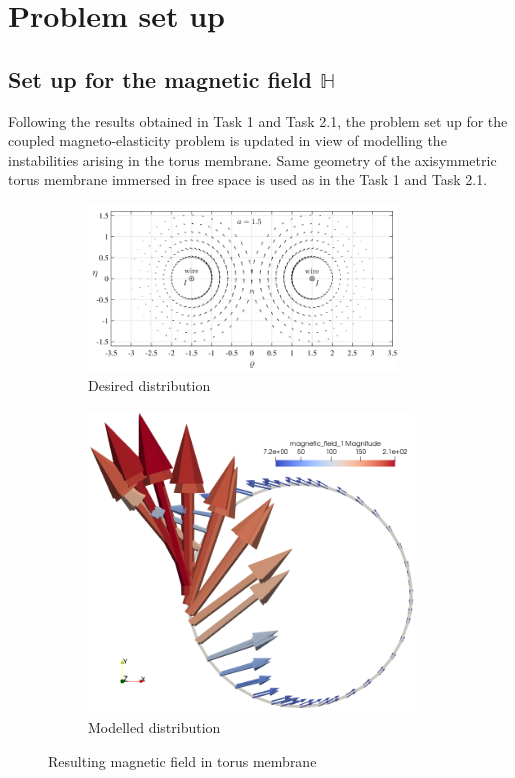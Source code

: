 \documentclass[11pt,a4paper,final]{article}
\begin{document}
\section{Problem set up}
\label{sec:problem_setup}

\subsection{Set up for the magnetic field $\mathbb{H}$}
Following the results obtained in Task 1 and Task 2.1, the problem set up for the coupled magneto-elasticity problem is updated in view of modelling the instabilities arising in the torus membrane. Same geometry of the axisymmetric torus membrane immersed in free space is used as in the Task 1 and Task 2.1.  \par 

\begin{figure}[h]
\centering
\begin{subfigure}{0.59\textwidth}
\centering
\includegraphics[width=0.9\textwidth]{magnetic_field_saxena.png}
\caption{Desired distribution \cite{Reddy2017}}
\label{fig:3.3.1}
\end{subfigure}
\begin{subfigure}{0.39\textwidth}
\centering
\includegraphics[width=0.95\textwidth]{2d_toroid_field_2.png}
\caption{Modelled distribution}
\label{fig:3.3.2}
\end{subfigure}
\caption{Resulting magnetic field in torus membrane}
\label{fig:3.3}
\end{figure}
\end{document}
